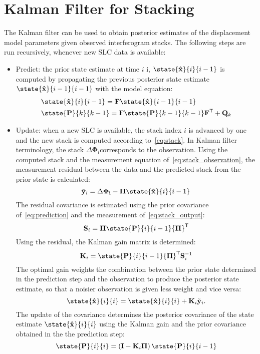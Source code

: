\documentclass{article}
\begin{document}
\section{Kalman Filter for Stacking}
The Kalman filter can be used to obtain posterior estimates of the displacement model parameters given  observed interferogram stacks. The following steps are run recursively, whenever new SLC data is available:
\begin{itemize}
	\item Predict: the prior state estimate at time $i$ i, $\state{\mathbf{\hat{x}}}{i}{i-1}$ is computed by propagating the  previous posterior state estimate $\state{\mathbf{\hat{x}}}{i-1}{i-1}$ with the model equation:
	\begin{align}\label{eq:prediction}
		&\state{\mathbf{\hat{x}}}{i}{i-1} = \mathbf{F} \state{\mathbf{\hat{x}}}{i-1}{i-1}\\
		&\state{\mathbf{P}}{k}{k-1} = \mathbf{F} \state{\mathbf{P}}{k-1}{k-1} \mathbf{F}^\mathsf{T} + \mathbf{Q}_{k}
	\end{align}
	\item Update: when a new SLC is available, the stack index $i$ is advanced by one and the new stack is computed according to~\autoref{eq:stack}. In Kalman filter terminology, the stack $\Delta\mathbf{\Phi_i} $corresponds to the observation. Using the computed stack and the measurement equation of~\autoref{eq:stack_observation}, the measurement residual  between the data and the predicted stack from the prior state is calculated:
	\begin{equation}
		\tilde{\mathbf{y}}_i = \Delta\mathbf{\Phi_i} - \mathbf{\Pi} \state{\mathbf{\hat{x}}}{i}{i-1}
	\end{equation}
	The residual covariance is estimated using the prior covariance of~\autoref{eq:prediction}  and the measurement of~\autoref{eq:stack_output}:
	\begin{equation}
		\mathbf{S}_i = \mathbf{\Pi} \state{\mathbf{P}}{i}{i-1}{\mathbf{\Pi}}^\mathsf{T}
	\end{equation}
	Using the residual, the Kalman gain matrix is determined:
	\begin{equation}
		\mathbf{K}_i = \state{\mathbf{P}}{i}{i-1}{\mathbf{\Pi}}^\mathsf{T}\mathbf{S}_i^{-1}
	\end{equation}
	The optimal gain weights the  combination between the prior state determined in the prediction step and the observation to produce the posterior state estimate, so that 
	a noisier observation is given less weight and vice versa:
	\begin{equation}
		\state{\mathbf{\hat{x}}}{i}{i} = \state{\mathbf{\hat{x}}}{i}{i} + \mathbf{K}_i \tilde{\mathbf{y}}_i.
	\end{equation}
	The update of the covariance determines the posterior covariance of the state estimate $\state{\mathbf{\hat{x}}}{i}{i}$ using the Kalman gain and the prior covariance obtained in the the prediction step:
	\begin{equation}
	\state{\mathbf{P}}{i}{i} = \left(\mathbf{I} - \mathbf{K}_i\mathbf{\Pi}\right)\state{\mathbf{P}}{i}{i-1}
	\end{equation}
\end{itemize}
\end{document}
